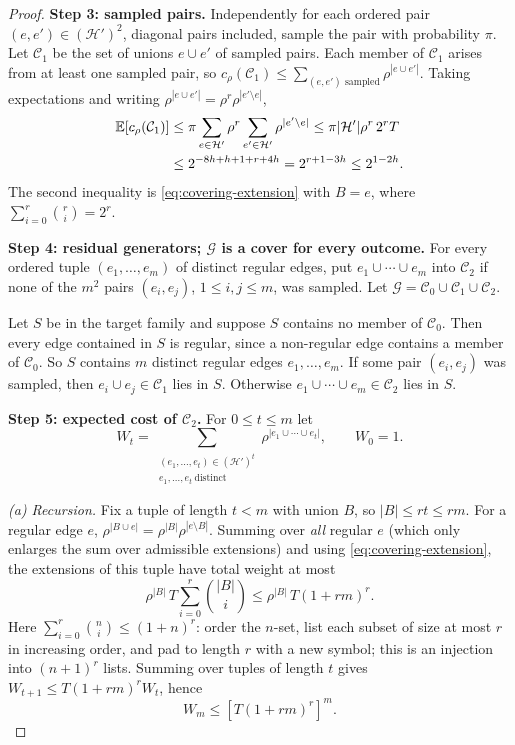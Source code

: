 \documentclass[11pt,letterpaper]{article}
\theoremstyle{definition}
\theoremstyle{remark}
\numberwithin{equation}{section}
\begin{document}
\begin{proof}
\medskip\noindent\textbf{Step 3: sampled pairs.}
Independently for each ordered pair $(e,e')\in(\mathcal H')^2$, diagonal pairs included, sample the pair with probability $\pi$. Let $\mathcal C_1$ be the set of unions $e\cup e'$ of sampled pairs. Each member of $\mathcal C_1$ arises from at least one sampled pair, so $c_\rho(\mathcal C_1)\le\sum_{(e,e')\text{ sampled}}\rho^{|e\cup e'|}$. Taking expectations and writing $\rho^{|e\cup e'|}=\rho^{r}\rho^{|e'\setminus e|}$,
\begin{align}
\mathbb E[c_\rho(\mathcal C_1)]
&\le\pi\sum_{e\in\mathcal H'}\rho^r\sum_{e'\in\mathcal H'}\rho^{|e'\setminus e|}
\le\pi|\mathcal H'|\rho^r\,2^rT
\notag\\
&\le2^{-8h+h+1+r+4h}=2^{r+1-3h}\le2^{1-2h}.
\label{eq:covering-pair-cost}
\end{align}
The second inequality is \eqref{eq:covering-extension} with $B=e$, where $\sum_{i=0}^r\binom ri=2^r$.

\medskip\noindent\textbf{Step 4: residual generators; $\mathcal G$ is a cover for every outcome.}
For every ordered tuple $(e_1,\ldots,e_m)$ of distinct regular edges, put $e_1\cup\cdots\cup e_m$ into $\mathcal C_2$ if none of the $m^2$ pairs $(e_i,e_j)$, $1\le i,j\le m$, was sampled. Let $\mathcal G=\mathcal C_0\cup\mathcal C_1\cup\mathcal C_2$.

Let $S$ be in the target family and suppose $S$ contains no member of $\mathcal C_0$. Then every edge contained in $S$ is regular, since a non-regular edge contains a member of $\mathcal C_0$. So $S$ contains $m$ distinct regular edges $e_1,\ldots,e_m$. If some pair $(e_i,e_j)$ was sampled, then $e_i\cup e_j\in\mathcal C_1$ lies in $S$. Otherwise $e_1\cup\cdots\cup e_m\in\mathcal C_2$ lies in $S$.

\medskip\noindent\textbf{Step 5: expected cost of $\mathcal C_2$.}
For $0\le t\le m$ let
\[
W_t=
\sum_{\substack{(e_1,\ldots,e_t)\in(\mathcal H')^t\\
                e_1,\ldots,e_t\ \text{distinct}}}
  \rho^{|e_1\cup\cdots\cup e_t|},
\qquad W_0=1.
\]

\emph{(a) Recursion.} Fix a tuple of length $t<m$ with union $B$, so $|B|\le rt\le rm$. For a regular edge $e$, $\rho^{|B\cup e|}=\rho^{|B|}\rho^{|e\setminus B|}$. Summing over \emph{all} regular $e$ (which only enlarges the sum over admissible extensions) and using \eqref{eq:covering-extension}, the extensions of this tuple have total weight at most
\[
\rho^{|B|}\,T\sum_{i=0}^r\binom{|B|}{i}\le\rho^{|B|}\,T(1+rm)^r.
\]
Here $\sum_{i=0}^r\binom ni\le(1+n)^r$: order the $n$-set, list each subset of size at most $r$ in increasing order, and pad to length $r$ with a new symbol; this is an injection into $(n+1)^r$ lists. Summing over tuples of length $t$ gives $W_{t+1}\le T(1+rm)^rW_t$, hence
\[
W_m\le[T(1+rm)^r]^m.
\]


\end{proof}
\end{document}
